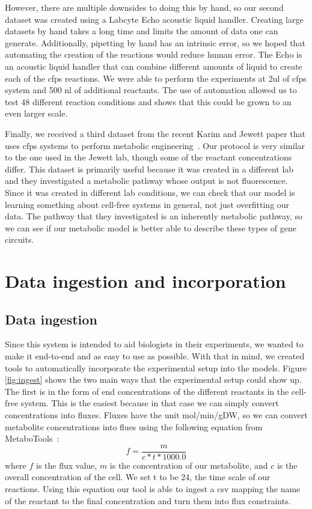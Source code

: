 However, there are multiple downsides to doing this by hand, so our second dataset was created using a Labcyte Echo acoustic liquid handler.
Creating large datasets by hand takes a long time and limits the amount of data one can generate.
Additionally, pipetting by hand has an intrinsic error, so we hoped that automating the creation of the reactions would reduce human error.
The Echo is an acoustic liquid handler that can combine different amounts of liquid to create each of the \gls{cfps} reactions.
We were able to perform the experiments at 2\gls{ul} of \gls{cfps} system and 500 \gls{nl} of additional reactants.
The use of automation allowed us to test 48 different reaction conditions and shows that this could be grown to an even larger scale.

Finally, we received a third dataset from the recent Karim and Jewett paper that uses \gls{cfps} systems to perform metabolic engineering~\cite{karim2018controlling}.
Our protocol is very similar to the one used in the Jewett lab, though some of the reactant concentrations differ.
This dataset is primarily useful because it was created in a different lab and they investigated a metabolic pathway whose output is not fluorescence.
Since it was created in different lab conditions, we can check that our model is learning something about cell-free systems in general, not just overfitting our data.
The pathway that they investigated is an inherently metabolic pathway, so we can see if our metabolic model is better able to describe these types of gene circuits.

\section{Data ingestion and incorporation}

\subsection{Data ingestion}
Since this system is intended to aid biologists in their experiments, we wanted to make it end-to-end and as easy to use as possible.
With that in mind, we created tools to automatically incorporate the experimental setup into the models.
Figure \ref{fig:ingest} shows the two main ways that the experimental setup could show up.
The first is in the form of end concentrations of the different reactants in the cell-free system.
This is the easiest because in that case we can simply convert concentrations into fluxes.
Fluxes have the unit mol/min/gDW, so we can convert metabolite concentrations into flues using the following equation from MetaboTools~\cite{aurich2016metabotools}:
\begin{equation}
f = \frac{m}{c * t * 1000.0}
\end{equation}
where $f$ is the flux value, $m$ is the concentration of our metabolite, and $c$ is the overall concentration of the cell.
We set t to be 24, the time scale of our reactions.
Using this equation our tool is able to ingest a \gls{csv} mapping the name of the reactant to the final concentration and turn them into flux constraints.

